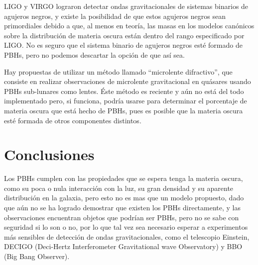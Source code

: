 \documentclass{article}
\begin{document}
LIGO y VIRGO lograron detectar ondas gravitacionales de sistemas binarios de agujeros negros, y existe la posibilidad de que estos agujeros negros sean primordiales debido a que, al menos en teor\'ia, las masas en los modelos can\'onicos sobre la distribuci\'on de materia oscura est\'an dentro del rango especificado por LIGO. No es seguro que el sistema binario de agujeros negros est\'e formado de PBHs, pero no podemos descartar la opci\'on de que as\'i sea. 

Hay propuestas de utilizar un m\'etodo llamado ``microlente difractivo'', que consiste en realizar observaciones de microlente gravitacional en qu\'asares usando PBHs sub-lunares como lentes. \'Este m\'etodo es reciente y a\'un no est\'a del todo implementado pero, si funciona, podr\'ia usarse para determinar el porcentaje de materia oscura que est\'a hecho de PBHs, pues es posible que la materia oscura est\'e formada de otros componentes distintos.



\section*{Conclusiones}

Los PBHs cumplen con las propiedades que se espera tenga la materia oscura, como su poca o nula interacci\'on con la luz, su gran densidad y su aparente distribuci\'on en la galaxia, pero esto no es mas que un modelo propuesto, dado que a\'un no se ha logrado demostrar que existen los PBHs directamente, y las observaciones encuentran objetos que podr\'ian ser PBHs, pero no se sabe con seguridad si lo son o no, por lo que tal vez sea necesario esperar a experimentos m\'as sensibles de detecci\'on de ondas gravitacionales, como el telescopio Einstein, DECIGO (Deci-Hertz Interferometer Gravitational wave Observatory) y BBO (Big Bang Observer).
\end{document}

